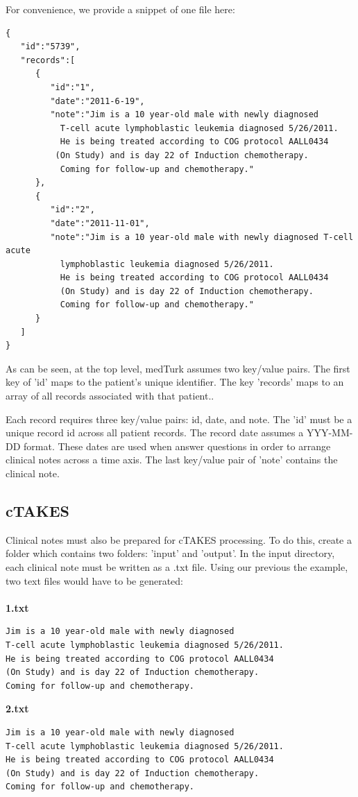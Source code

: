 \documentclass{book}
\begin{document}
For convenience, we provide a snippet of one file here:
\begin{verbatim}
{
   "id":"5739",
   "records":[
      {
         "id":"1",
         "date":"2011-6-19",
         "note":"Jim is a 10 year-old male with newly diagnosed 
		   T-cell acute lymphoblastic leukemia diagnosed 5/26/2011. 
		   He is being treated according to COG protocol AALL0434 
		  (On Study) and is day 22 of Induction chemotherapy. 
		   Coming for follow-up and chemotherapy."
      },
      {
         "id":"2",
         "date":"2011-11-01",
         "note":"Jim is a 10 year-old male with newly diagnosed T-cell acute 
 		   lymphoblastic leukemia diagnosed 5/26/2011. 
		   He is being treated according to COG protocol AALL0434 
 		   (On Study) and is day 22 of Induction chemotherapy. 
		   Coming for follow-up and chemotherapy."
      }
   ]
}
\end{verbatim}

As can be seen, at the top level, medTurk assumes two key/value pairs. The first key of 'id' maps to the patient's unique identifier. The key 'records' maps to an array of all records associated with that patient..

Each record requires three key/value pairs: id, date, and note. The 'id' must be a unique record id across all patient records. The record date assumes a YYY-MM-DD format. These dates are used when answer questions in order to arrange clinical notes across a time axis. The last key/value pair of 'note' contains the clinical note.

\subsection*{cTAKES}

Clinical notes must also be prepared for cTAKES processing. To do this, create a folder which contains two folders: 'input' and 'output'. In the input directory, each clinical note must be written as a .txt file. Using our previous the example, two text files would have to be generated:
\\
\\
\textbf{1.txt}
\begin{verbatim}
Jim is a 10 year-old male with newly diagnosed 
T-cell acute lymphoblastic leukemia diagnosed 5/26/2011. 
He is being treated according to COG protocol AALL0434 
(On Study) and is day 22 of Induction chemotherapy. 
Coming for follow-up and chemotherapy.
\end{verbatim}
\textbf{2.txt}
\begin{verbatim}
Jim is a 10 year-old male with newly diagnosed 
T-cell acute lymphoblastic leukemia diagnosed 5/26/2011. 
He is being treated according to COG protocol AALL0434 
(On Study) and is day 22 of Induction chemotherapy. 
Coming for follow-up and chemotherapy.
\end{verbatim}
\end{document}
